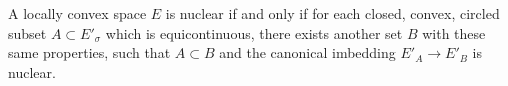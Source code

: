 A locally convex space $E$ is nuclear if and only if for each closed, convex, circled subset $A \subset E'_\sigma$ which is equicontinuous, there exists another set $B$ with these same properties, such that $A \subset B$ and the canonical imbedding $E'_A \to E'_B$ is nuclear.
